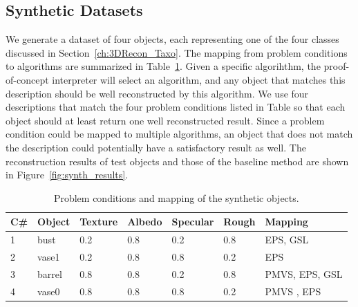 \subsection{Synthetic Datasets}
We generate a dataset of four objects, each representing one of the four classes discussed in Section~\ref{ch:3DRecon_Taxo}. The mapping from problem conditions to algorithms are summarized in Table~\ref{tab:synth_prop_list}. Given a specific algorihthm, the proof-of-concept interpreter will select an algorithm, and any object that matches this description should be well reconstructed by this algorithm. We use four descriptions that match the four problem conditions listed in Table so that each object should at least return one well reconstructed result. Since a problem condition could be mapped to multiple algorithms, an object that does not match the description could potentially have a satisfactory result as well. The reconstruction results of test objects and those of the baseline method are shown in Figure~\ref{fig:synth_results}.
\begin{table}[!htbp]
  \centering
  \begin{tabular}{lllllll}
  \hline
  \textbf{C\#} & \textbf{Object} & Texture & Albedo & Specular & Rough & Mapping\\
  \hline
  1 & bust & 0.2 & 0.8 & 0.2 & 0.8 & EPS, GSL\\
  2 & vase1 & 0.2 & 0.8 & 0.8 & 0.2 & EPS\\
  3 & barrel & 0.8 & 0.8 & 0.2 & 0.8 & PMVS, EPS, GSL\\
  4 & vase0 & 0.8 & 0.8 & 0.8 & 0.2 & PMVS , EPS\\
  \hline
  \end{tabular}
  \caption{Problem conditions and mapping of the synthetic objects.}
  \label{tab:synth_prop_list}
\end{table}


